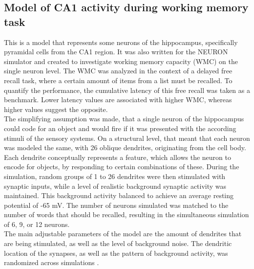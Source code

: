    \subsection{Model of CA1 activity during working memory task}
    This is a model that represents some neurons of the hippocampus, specifically pyramidal cells from the CA1 region. It was also written for the NEURON simulator and created to investigate working memory capacity (WMC) on the single neuron level. The WMC was analyzed in the context of a delayed free recall task, where a certain amount of items from a list must be recalled. To quantify the performance, the cumulative latency of this free recall was taken as a benchmark. Lower latency values are associated with higher WMC, whereas higher values suggest the opposite. \\
    The simplifying assumption was made, that a single neuron of the hippocampus could code for an object and would fire if it was presented with the according stimuli of the sensory systems. On a structural level, that meant that each neuron was modeled the same, with 26 oblique dendrites, originating from the cell body. Each dendrite conceptually represents a feature, which allows the neuron to encode for objects, by responding to certain combinations of these. During the simulation, random groups of 1 to 26 dendrites were then stimulated with synaptic inputs, while a level of realistic background synaptic activity was maintained. This background activity balanced to achieve an average resting potential of -65 mV. The number of neurons simulated was matched to the number of words that should be recalled, resulting in the simultaneous simulation of 6, 9, or 12 neurons. \\
    The main adjustable parameters of the model are the amount of dendrites that are being stimulated, as well as the level of background noise. The dendritic location of the synapses, as well as the pattern of background activity, was randomized across simulations \cite{Spera.2016}.
    
    
